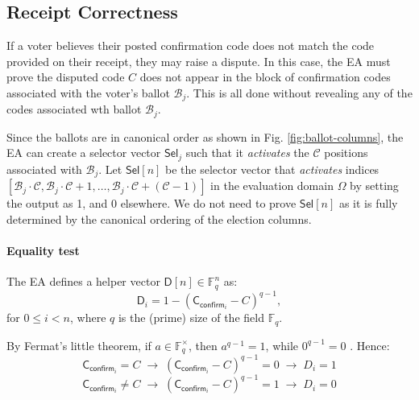 \subsection{Receipt Correctness}
\label{subsec:receipt-correctness}

If a voter believes their posted confirmation code does not match the code provided on their receipt, they may raise a dispute.  
In this case, the EA must prove the disputed code $C$ does not appear in the block of confirmation codes associated with the
voter's ballot $\mathcal{B}_j$. This is all done without revealing any of the codes associated wth ballot $\mathcal{B}_j$.


Since the ballots are in canonical order as shown in Fig. \ref{fig:ballot-columns}, the EA can create a selector vector $\mathsf{Sel}_j$ such that it \emph{activates} the $\mathcal{C}$ positions associated with $\mathcal{B}_j$. Let $\mathsf{Sel}[n]$ be the selector vector that \emph{activates} indices $[\mathcal{B}_j\cdot\mathcal{C}, \mathcal{B}_j\cdot\mathcal{C}+1,\dots, \mathcal{B}_j\cdot\mathcal{C}+(\mathcal{C}-1)]$ in the evaluation domain $\Omega$ by setting the output as 1, and 0 elsewhere.
We do not need to prove $\mathsf{Sel}[n]$ as it is fully determined by the canonical ordering of the election columns.  


\paragraph{Equality test}\mbox{}\newline
The EA defines a helper vector
$\mathsf{D}[n] \in \mathbb{F}_q^n$ as:
\begin{equation}
  \label{eq:d}
  \mathsf{D}_i = 1 - (\mathsf{C}_{\mathsf{confirm}_i} - C)^{q-1},  
\end{equation}
for $0 \le i < n$, where $q$ is the (prime) size of the field $\mathbb{F}_q$.

By Fermat's little theorem, if $a \in \mathbb{F}_q^\times$, then
$a^{q-1} = 1$, while $0^{q-1} = 0$ \cite{EulerFermatLittleTheorem1736}. 
Hence:
\begin{equation}
  \label{eq:true}
\mathsf{C}_{\mathsf{confirm}_i} = C \;\rightarrow\; (\mathsf{C}_{\mathsf{confirm}_i} - C)^{q-1} = 0 \;\rightarrow\; D_i = 1
\end{equation}
\begin{equation}
  \label{eq:false}
\mathsf{C}_{\mathsf{confirm}_i} \ne C \;\rightarrow\; (\mathsf{C}_{\mathsf{confirm}_i} - C)^{q-1} = 1 \;\rightarrow\; D_i = 0\end{equation}
  
